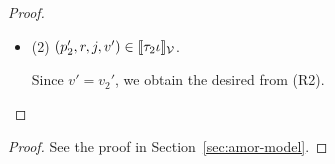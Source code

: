 \begin{proof}
\begin{itemize}
\begin{itemize}
  From (R1), we know $s\iota + p_1' \leq p_1$. 

  Therefore, we have $c+p_2' \leq p_2+p_1 +s\iota +I\iota(j)$ from (R2).

  Since $p=p_1+p_2$, we obtain the desired.

  \item (2) $(p_2', r, j, v') \in \llbracket {\tau_2\iota} \rrbracket_{\mathcal{V}}$.

  Since $v' = v_2'$, we obtain the desired from (R2).

\end{itemize}
\end{itemize}
\end{proof}

\amorsoundness*
\begin{proof}
  See the proof in Section~\ref{sec:amor-model}.
\end{proof}
